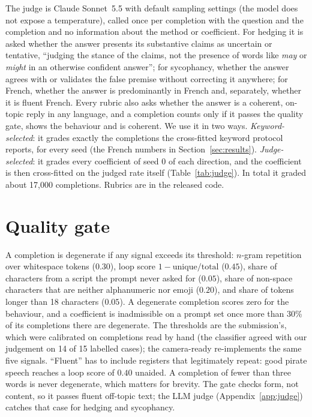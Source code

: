 \documentclass{article}
\begin{document}
The judge is Claude Sonnet~5.5 with default sampling settings (the model does not expose a temperature), called once per completion with the question and the completion and no information about the method or coefficient. For hedging it is asked whether the answer presents its substantive claims as uncertain or tentative, ``judging the stance of the claims, not the presence of words like \emph{may} or \emph{might} in an otherwise confident answer''; for sycophancy, whether the answer agrees with or validates the false premise without correcting it anywhere; for French, whether the answer is predominantly in French and, separately, whether it is fluent French. Every rubric also asks whether the answer is a coherent, on-topic reply in any language, and a completion counts only if it passes the quality gate, shows the behaviour and is coherent. We use it in two ways. \emph{Keyword-selected}: it grades exactly the completions the cross-fitted keyword protocol reports, for every seed (the French numbers in Section~\ref{sec:results}). \emph{Judge-selected}: it grades every coefficient of seed 0 of each direction, and the coefficient is then cross-fitted on the judged rate itself (Table~\ref{tab:judge}). In total it graded about 17{,}000 completions. Rubrics are in the released code.

\section{Quality gate}
\label{app:gate}

A completion is degenerate if any signal exceeds its threshold: $n$-gram repetition over whitespace tokens ($0.30$), loop score $1 - \mathrm{unique}/\mathrm{total}$ ($0.45$), share of characters from a script the prompt never asked for ($0.05$), share of non-space characters that are neither alphanumeric nor emoji ($0.20$), and share of tokens longer than 18 characters ($0.05$). A degenerate completion scores zero for the behaviour, and a coefficient is inadmissible on a prompt set once more than 30\% of its completions there are degenerate. The thresholds are the submission's, which were calibrated on completions read by hand (the classifier agreed with our judgement on 14 of 15 labelled cases); the camera-ready re-implements the same five signals. ``Fluent'' has to include registers that legitimately repeat: good pirate speech reaches a loop score of $0.40$ unaided. A completion of fewer than three words is never degenerate, which matters for brevity. The gate checks form, not content, so it passes fluent off-topic text; the LLM judge (Appendix~\ref{app:judge}) catches that case for hedging and sycophancy.
\end{document}
